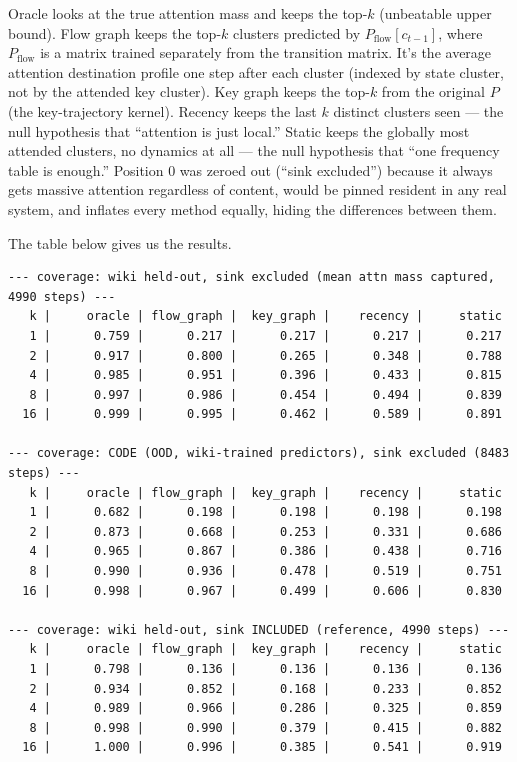 \documentclass[11pt,a4paper]{article}
\begin{document}
Oracle looks at the true attention mass and keeps the top-$k$ (unbeatable upper bound). Flow graph keeps the top-$k$ clusters predicted by $P_{\text{flow}}[c_{t-1}]$, where $P_{\text{flow}}$ is a matrix trained separately from the transition matrix. It's the average attention destination profile one step after each cluster (indexed by state cluster, not by the attended key cluster). Key graph keeps the top-$k$ from the original $P$ (the key-trajectory kernel). Recency keeps the last $k$ distinct clusters seen --- the null hypothesis that ``attention is just local.'' Static keeps the globally most attended clusters, no dynamics at all --- the null hypothesis that ``one frequency table is enough.'' Position 0 was zeroed out (``sink excluded'') because it always gets massive attention regardless of content, would be pinned resident in any real system, and inflates every method equally, hiding the differences between them.

The table below gives us the results.

{\footnotesize
\begin{verbatim}
--- coverage: wiki held-out, sink excluded (mean attn mass captured, 4990 steps) ---
   k |     oracle | flow_graph |  key_graph |    recency |     static
   1 |      0.759 |      0.217 |      0.217 |      0.217 |      0.217
   2 |      0.917 |      0.800 |      0.265 |      0.348 |      0.788
   4 |      0.985 |      0.951 |      0.396 |      0.433 |      0.815
   8 |      0.997 |      0.986 |      0.454 |      0.494 |      0.839
  16 |      0.999 |      0.995 |      0.462 |      0.589 |      0.891

--- coverage: CODE (OOD, wiki-trained predictors), sink excluded (8483 steps) ---
   k |     oracle | flow_graph |  key_graph |    recency |     static
   1 |      0.682 |      0.198 |      0.198 |      0.198 |      0.198
   2 |      0.873 |      0.668 |      0.253 |      0.331 |      0.686
   4 |      0.965 |      0.867 |      0.386 |      0.438 |      0.716
   8 |      0.990 |      0.936 |      0.478 |      0.519 |      0.751
  16 |      0.998 |      0.967 |      0.499 |      0.606 |      0.830

--- coverage: wiki held-out, sink INCLUDED (reference, 4990 steps) ---
   k |     oracle | flow_graph |  key_graph |    recency |     static
   1 |      0.798 |      0.136 |      0.136 |      0.136 |      0.136
   2 |      0.934 |      0.852 |      0.168 |      0.233 |      0.852
   4 |      0.989 |      0.966 |      0.286 |      0.325 |      0.859
   8 |      0.998 |      0.990 |      0.379 |      0.415 |      0.882
  16 |      1.000 |      0.996 |      0.385 |      0.541 |      0.919
\end{verbatim}
}
\end{document}
